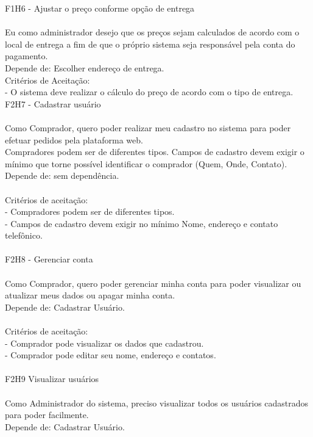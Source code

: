 F1H6 - Ajustar o preço conforme opção de entrega\\
\\
\tab Eu como administrador desejo que os preços sejam calculados de acordo com o local de entrega a fim de que o próprio sistema seja responsável pela conta do pagamento.\\
\tab Depende de: Escolher endereço de entrega.\\
\tab Critérios de Aceitação:\\
\tab - O sistema deve realizar o cálculo do preço de acordo com o tipo de entrega.\\

F2H7 - Cadastrar usuário\\
\\
\tab Como Comprador, quero poder realizar meu cadastro no sistema para poder efetuar pedidos pela plataforma web.\\
\tab Compradores podem ser de diferentes tipos. Campos de cadastro devem exigir o mínimo que torne possível identificar o comprador (Quem, Onde, Contato).\\
\tab Depende de: sem dependência.\\
\\
\tab Critérios de aceitação:\\
\tab - Compradores podem ser de diferentes tipos.\\
\tab - Campos de cadastro devem exigir no mínimo Nome, endereço e contato telefônico.\\
\\
F2H8 - Gerenciar conta\\
\\
\tab Como Comprador, quero poder gerenciar minha conta para poder visualizar ou atualizar meus dados ou apagar minha conta.\\
\tab Depende de: Cadastrar Usuário.\\
\\
\tab Critérios de aceitação:\\
\tab - Comprador pode visualizar os dados que cadastrou.\\
\tab - Comprador pode editar seu nome, endereço e contatos.\\
\\
F2H9 Visualizar usuários\\
\\
\tab Como Administrador do sistema, preciso visualizar todos os usuários cadastrados para poder facilmente.\\
\tab Depende de: Cadastrar Usuário.\\
